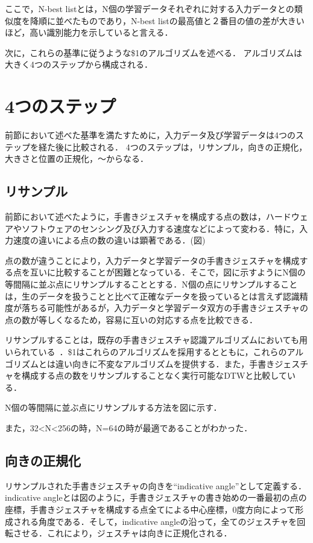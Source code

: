 ここで，N-best listとは，N個の学習データそれぞれに対する入力データとの類似度を降順に並べたものであり，N-best listの最高値と２番目の値の差が大きいほど，高い識別能力を示していると言える．

次に，これらの基準に従うような\$1のアルゴリズムを述べる．
アルゴリズムは大きく4つのステップから構成される．


\section{4つのステップ}
前節において述べた基準を満たすために，入力データ及び学習データは4つのステップを経た後に比較される．
4つのステップは，リサンプル，向きの正規化，大きさと位置の正規化，〜からなる．

\subsection{リサンプル}
前節において述べたように，手書きジェスチャを構成する点の数は，ハードウェアやソフトウェアのセンシング及び入力する速度などによって変わる．特に，入力速度の違いによる点の数の違いは顕著である．(図)

点の数が違うことにより，入力データと学習データの手書きジェスチャを構成する点を互いに比較することが困難となっている．そこで，図に示すようにN個の等間隔に並ぶ点にリサンプルすることとする．N個の点にリサンプルすることは，生のデータを扱うことと比べて正確なデータを扱っているとは言えず認識精度が落ちる可能性があるが，入力データと学習データ双方の手書きジェスチャの点の数が等しくなるため，容易に互いの対応する点を比較できる．

リサンプルすることは，既存の手書きジェスチャ認識アルゴリズムにおいても用いられている~\cite{Plamondon:2000:OOH:331097.331275, Tappert:1990:SAO:83123.83137, Kristensson:2004:SLV:1029632.1029640, Zhai:2003:SWS:642611.642630, Tappert:1982:CSR:1664966.1664979}．\$1はこれらのアルゴリズムを採用するとともに，これらのアルゴリズムとは違い向きに不変なアルゴリズムを提供する．また，手書きジェスチャを構成する点の数をリサンプルすることなく実行可能なDTWと比較している．

N個の等間隔に並ぶ点にリサンプルする方法を図に示す．

また，32<N<256の時，N=64の時が最適であることがわかった．

\subsection{向きの正規化}
リサンプルされた手書きジェスチャの向きを``indicative angle''として定義する．indicative angleとは図のように，手書きジェスチャの書き始めの一番最初の点の座標，手書きジェスチャを構成する点全てによる中心座標，0度方向によって形成される角度である．そして，indicative angleの沿って，全てのジェスチャを回転させる．これにより，ジェスチャは向きに正規化される．


